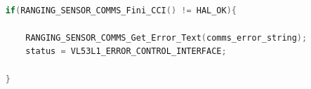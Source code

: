 
\begin{lstlisting}[language=Cpp, caption={\footnotesize Dettaglio sull'invocazione di \textit{RANGING\_SENSOR\_COMMS\_Fini\_CCI} in \textit{VL53L1\_CommsClose}}]
    
    if(RANGING_SENSOR_COMMS_Fini_CCI() != HAL_OK){

        RANGING_SENSOR_COMMS_Get_Error_Text(comms_error_string);
        status = VL53L1_ERROR_CONTROL_INTERFACE;

    }
\end{lstlisting}

